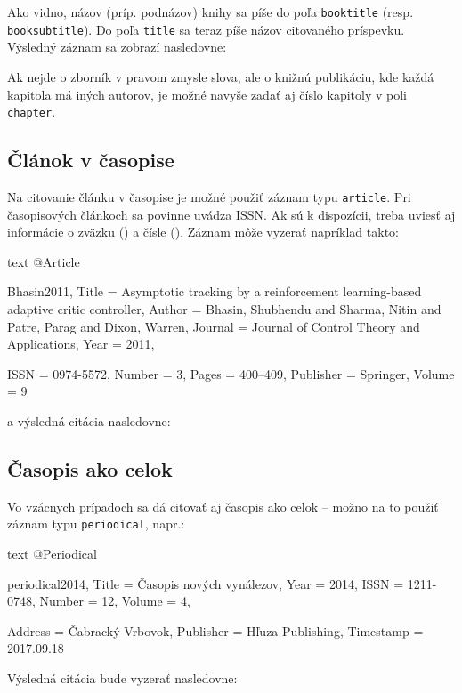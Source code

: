 Ako vidno, názov (príp. podnázov) knihy sa píše do poľa \texttt{booktitle} (resp. \texttt{booksubtitle}). Do poľa \texttt{title} sa teraz píše názov citovaného príspevku. Výsledný záznam sa zobrazí nasledovne:

\noindent[X] 

Ak nejde o zborník v pravom zmysle slova, ale o knižnú publikáciu, kde každá kapitola má iných autorov, je možné navyše zadať aj číslo kapitoly v poli \texttt{chapter}.

\subsection{Článok v časopise}

Na citovanie článku v časopise je možné použiť záznam typu \texttt{article}. Pri časopisových článkoch sa povinne uvádza ISSN. Ak sú k dispozícii, treba uviesť aj informácie o zväzku () a čísle (). Záznam môže vyzerať napríklad takto:
\begin{inlinecode}{text}
@Article{Bhasin2011,
  Title                    = {Asymptotic tracking by a reinforcement learning-based adaptive critic controller},
  Author                   = {Bhasin, Shubhendu and Sharma, Nitin and Patre, Parag and Dixon, Warren},
  Journal                  = {Journal of Control Theory and Applications},
  Year                     = {2011},

  ISSN                     = {0974-5572},
  Number                   = {3},
  Pages                    = {400--409},
  Publisher                = {Springer},
  Volume                   = {9}
}
\end{inlinecode}
a výsledná citácia nasledovne:

\noindent[X] 

\subsection{Časopis ako celok}

Vo vzácnych prípadoch sa dá citovať aj časopis ako celok -- možno na to použiť záznam typu \texttt{periodical}, napr.:
\begin{inlinecode}{text}
@Periodical{periodical2014,
  Title                    = {Časopis nových vynálezov},
  Year                     = {2014},
  ISSN                     = {1211-0748},
  Number                   = {12},
  Volume                   = {4},

  Address                  = {Čabracký Vrbovok},
  Publisher                = {Hľuza Publishing},
  Timestamp                = {2017.09.18}
}
\end{inlinecode}
Výsledná citácia bude vyzerať nasledovne:

